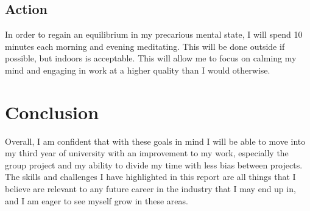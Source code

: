 \documentclass{scrartcl}
\begin{document}
\subsection{Action}

In order to regain an equilibrium in my precarious mental state, I will spend 10 minutes each morning and evening meditating. This will be done outside if possible, but indoors is acceptable. This will allow me to focus on calming my mind and engaging in work at a higher quality than I would otherwise.

\section{Conclusion}

Overall, I am confident that with these goals in mind I will be able to move into my third year of university with an improvement to my work, especially the group project and my ability to divide my time with less bias between projects. The skills and challenges I have highlighted in this report are all things that I believe are relevant to any future career in the industry that I may end up in, and I am eager to see myself grow in these areas.



%
\end{document}
